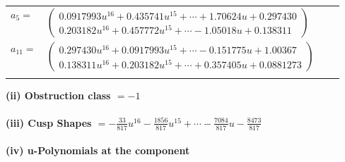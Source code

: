 \documentclass[1p]{elsarticle_modified}
\theoremstyle{definition}
\begin{document}
\begin{tabular}{m{7pt} m{180pt} m{7pt} m{180pt} }
\flushright $a_{5}=$&$\begin{pmatrix}0.0917993 u^{16}+0.435741 u^{15}+\cdots+1.70624 u+0.297430\\0.203182 u^{16}+0.457772 u^{15}+\cdots-1.05018 u+0.138311\end{pmatrix}$ \\
\flushright $a_{11}=$&$\begin{pmatrix}0.297430 u^{16}+0.0917993 u^{15}+\cdots-0.151775 u+1.00367\\0.138311 u^{16}+0.203182 u^{15}+\cdots+0.357405 u+0.0881273\end{pmatrix}$\\&\end{tabular}
\flushleft \textbf{(ii) Obstruction class $= -1$}\\~\\
\flushleft \textbf{(iii) Cusp Shapes $= -\frac{33}{817} u^{16}-\frac{1856}{817} u^{15}+\cdots-\frac{7084}{817} u-\frac{8473}{817}$}\\~\\
\newpage\renewcommand{\arraystretch}{1}
\flushleft \textbf{(iv) u-Polynomials at the component}\newline \\
\end{document}

